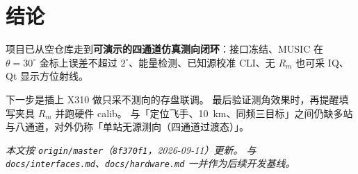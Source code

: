 \documentclass[UTF8,a4paper,12pt,zihao=-4]{ctexart}
\newcommand{\done}[1]{\textcolor{doneC}{#1}}
\newcommand{\upd}[1]{\textcolor{updC}{#1}}
\newcommand{\pend}[1]{\textcolor{pendC}{#1}}
\newcommand{\remind}[1]{\textcolor{remindC}{#1}}
\begin{document}
\section{结论}

项目已从空仓库走到\done{\textbf{可演示的四通道仿真测向闭环}}：接口冻结、MUSIC 在 $\theta=30^\circ$ 金标上误差不超过 $2^\circ$、能量检测、已知源校准 CLI、无 $R_m$ 也可采 IQ、Qt 显示方位射线。

\pend{下一步是插上 X310 做只采不测向的存盘联调。}
\remind{最后验证测角效果时，再提醒填写夹具 $R_m$ 并跑硬件 calib。}
与「定位飞手、10~km、同频三目标」之间仍缺多站与八通道，对外仍称「单站无源测向（四通道过渡态）」。

\vspace{1.2em}
\noindent\textit{\upd{本文按 \texttt{origin/master}（\texttt{8f370f1}，2026-09-11）更新。} 与 \texttt{docs/interfaces.md}、\texttt{docs/hardware.md} 一并作为后续开发基线。}
\end{document}
